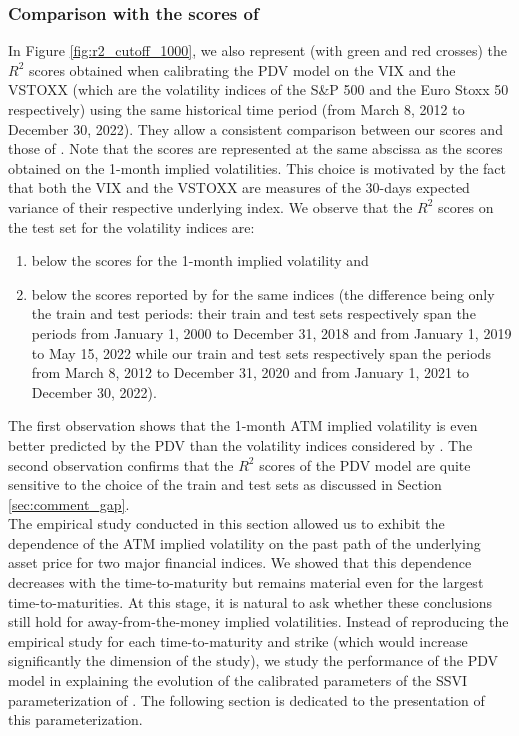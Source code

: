 \subsubsection{Comparison with the scores of \cite{guyon2022volatility}}
In Figure \ref{fig:r2_cutoff_1000}, we also represent (with green and red crosses) the $R^2$ scores obtained when calibrating the PDV model on the VIX and the VSTOXX (which are the volatility indices of the S\&P 500 and the Euro Stoxx 50 respectively) using the same historical time period (from March 8, 2012 to December 30, 2022). They allow a consistent comparison between our scores and those of \cite{guyon2022volatility}. Note that the scores are represented at the same abscissa as the scores obtained on the 1-month implied volatilities. This choice is motivated by the fact that both the VIX and the VSTOXX are measures of the 30-days expected variance of their respective underlying index. We observe that the $R^2$ scores on the test set for the volatility indices are: 
\begin{enumerate}
    \item below the scores for the 1-month implied volatility and 
    \item below the scores reported by \cite{guyon2022volatility} for the same indices (the difference being only the train and test periods: their train and test sets respectively span the periods from January 1, 2000 to December 31, 2018 and from January 1, 2019 to May 15, 2022 while our train and test sets respectively span the periods from March 8, 2012 to December 31, 2020 and from January 1, 2021 to December 30, 2022).
\end{enumerate}
The first observation shows that the 1-month ATM implied volatility is even better predicted by the PDV than the volatility indices considered by \cite{guyon2022volatility}. The second observation confirms that the $R^2$ scores of the PDV model are quite sensitive to the choice of the train and test sets as discussed in Section \ref{sec:comment_gap}. \\

The empirical study conducted in this section allowed us to exhibit the dependence of the ATM implied volatility on the past path of the underlying asset price for two major financial indices. We showed that this dependence decreases with the time-to-maturity but remains material even for the largest time-to-maturities. At this stage, it is natural to ask whether these conclusions still hold for away-from-the-money implied volatilities. Instead of reproducing the empirical study for each time-to-maturity and strike (which would increase significantly the dimension of the study), we study the performance of the PDV model in explaining the evolution of the calibrated parameters of the SSVI parameterization of \cite{gatheral2014arbitrage}. The following section is dedicated to the presentation of this parameterization. 

